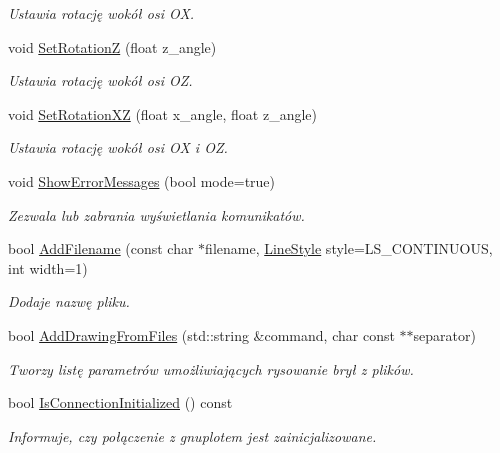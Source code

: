 \begin{DoxyCompactItemize}
\begin{DoxyCompactList}\small\item\em Ustawia rotację wokół osi {\itshape OX}. \end{DoxyCompactList}\item 
void \hyperlink{class_pz_g_1_1_gnuplot_link_a2d72e30d46e7fb61fbf70f2ea5c0d0a5}{Set\+RotationZ} (float z\+\_\+angle)
\begin{DoxyCompactList}\small\item\em Ustawia rotację wokół osi {\itshape OZ}. \end{DoxyCompactList}\item 
void \hyperlink{class_pz_g_1_1_gnuplot_link_ae1019984feb2a9cef9c8b41eec65ee97}{Set\+Rotation\+XZ} (float x\+\_\+angle, float z\+\_\+angle)
\begin{DoxyCompactList}\small\item\em Ustawia rotację wokół osi {\itshape OX} i {\itshape OZ}. \end{DoxyCompactList}\item 
void \hyperlink{class_pz_g_1_1_gnuplot_link_a9c8f23498ce784bd4f62583163e9c065}{Show\+Error\+Messages} (bool mode=true)
\begin{DoxyCompactList}\small\item\em Zezwala lub zabrania wyświetlania komunikatów. \end{DoxyCompactList}\item 
bool \hyperlink{class_pz_g_1_1_gnuplot_link_a795ee974694d79694496e09d668eb562}{Add\+Filename} (const char $\ast$filename, \hyperlink{namespace_pz_g_ab0580cdb6bfe9e51d7de2588bc824076}{Line\+Style} style=L\+S\+\_\+\+C\+O\+N\+T\+I\+N\+U\+O\+US, int width=1)
\begin{DoxyCompactList}\small\item\em Dodaje nazwę pliku. \end{DoxyCompactList}\item 
bool \hyperlink{class_pz_g_1_1_gnuplot_link_a8f6eb81e4b1324d338a13de9fe692583}{Add\+Drawing\+From\+Files} (std\+::string \&command, char const $\ast$$\ast$separator)
\begin{DoxyCompactList}\small\item\em Tworzy listę parametrów umożliwiających rysowanie brył z plików. \end{DoxyCompactList}\item 
bool \hyperlink{class_pz_g_1_1_gnuplot_link_a23e53f7a9d3ca945545f9292c55a7c96}{Is\+Connection\+Initialized} () const
\begin{DoxyCompactList}\small\item\em Informuje, czy połączenie z {\itshape gnuplot\textquotesingle{}em} jest zainicjalizowane. \end{DoxyCompactList}\item 
$$
\end{DoxyCompactItemize}
